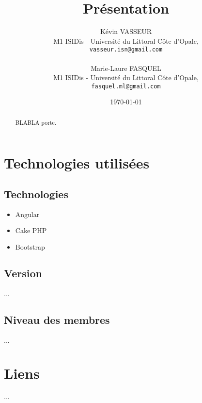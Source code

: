 \documentclass{article}
\title{Pr\'{e}sentation}
\author{K\'{e}vin VASSEUR\\
   M1 ISIDis - Universit\'{e} du Littoral C\^{o}te d'Opale,\\
   \texttt{vasseur.isn@gmail.com}\\
   \\
   Marie-Laure FASQUEL\\
   M1 ISIDis - Universit\'{e} du Littoral C\^{o}te d'Opale,\\
   \texttt{fasquel.ml@gmail.com}
}
\date{\today}
\begin{document}
	\maketitle
	\begin{abstract}
		BLABLA porte.
	\end{abstract}	
	\section{Technologies utilis\'{e}es}
		\subsection{Technologies}
			\begin{itemize}
				\item Angular
				\item Cake PHP
				\item Bootstrap
			\end{itemize}
		\subsection{Version}
		...
		\subsection{Niveau des membres}
		...
		
	\section{Liens}
	...
\end{document}
